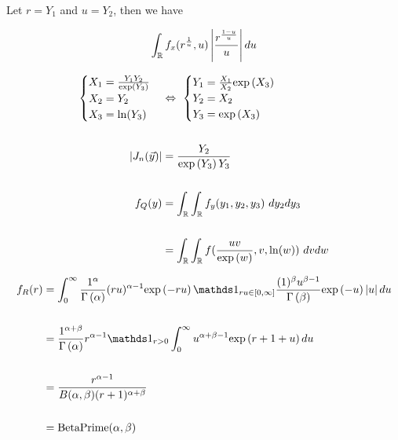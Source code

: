 \documentclass[12pt]{article}
\begin{document}
\begin{enumerate}
Let $r = Y_1$ and $u = Y _2$, then we have

\begin{align*}
    \int_{\mathbb{R}} f_x(r^{\frac{1}{u}}, u) \left|\frac{r^{\frac{1-u}{u}}}{u}\right| du
\end{align*} 




\begin{align*}
    \begin{cases}
        X_1 = \frac{Y_1Y_2}{\mathrm{exp}\left(Y_3\right)} \\ 
        X_2 = Y_2 \\ 
        X_3 = \ln( Y_3)
    \end{cases}
    &\Leftrightarrow~
    \begin{cases}
        Y_1 = \frac{X_1}{X_2} \mathrm{exp}\left(X_3\right) \\
        Y_2 = X_2 \\ 
        Y_3 = \mathrm{exp}\left(X_3\right) 
    \end{cases} \\ \\ 
    \left|J_n(\vec{y})\right| &= \frac{Y_2}{\mathrm{exp}\left(Y_3\right) Y_3} \\ \\ 
    f_Q(y) &= \int_{\mathbb{R}} \int_{\mathbb{R}} f_y(y_1, y_2, y_3) ~ dy_2 dy_3 \\ \\
    &= \int_{\mathbb{R}} \int_{\mathbb{R}} f(\frac{uv}{\mathrm{exp}\left(w\right)}, v, \ln(w)) ~dv dw
\end{align*}



\begin{align*}
    f_R(r) &= \int_0^\infty \frac{1^\alpha}{\Gammaf{\alpha}} (ru)^{\alpha-1} \exp{-ru} \indic{ru \in [0, \infty]} \frac{(1)^\beta u^{\beta-1}}{\Gammaf{\beta}}\exp{-u} \abss{u} du \\ \\
    &= \frac{1^{\alpha + \beta}}{\Gammaf{\alpha}} r^{\alpha-1}  \indic{r > 0} \int_0^\infty u^{\alpha + \beta - 1} \exp{r+1+u} du  \\ \\ 
    &= \frac{r^{\alpha - 1}}{B(\alpha, \beta) (r+1)^{\alpha + \beta}} \\ \\ 
    &= \text{BetaPrime}(\alpha, \beta)
\end{align*}

\end{enumerate}
\end{document}
